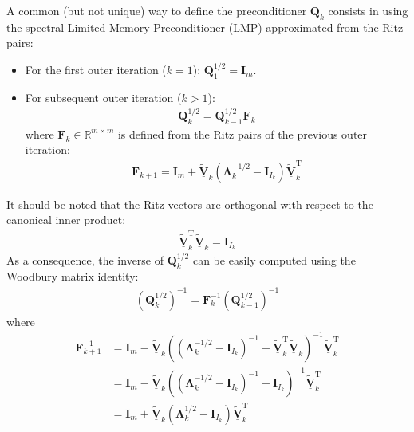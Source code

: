 \documentclass[12pt]{scrartcl}
\begin{document}
A common (but not unique) way to define the preconditioner $\mathbf{Q}_k$ consists in using the spectral Limited Memory Preconditioner (LMP) approximated from the Ritz pairs:
\begin{itemize}
\item For the first outer iteration ($k=1$): $\mathbf{Q}^{1/2}_1 = \mathbf{I}_m$.
\item For subsequent outer iteration ($k>1$):
\begin{align}
\mathbf{Q}^{1/2}_k = \mathbf{Q}^{1/2}_{k-1} \mathbf{F}_k
\end{align}
where $\mathbf{F}_k \in \mathbb{R}^{m \times m}$ is defined from the Ritz pairs of the previous outer iteration:
\begin{align}
\mathbf{F}_{k+1} = \mathbf{I}_m+\underline{\widetilde{\mathbf{V}}}_k \left(\mathbf{\Lambda}_k^{-1/2} - \mathbf{I}_{I_k}\right) \underline{\widetilde{\mathbf{V}}}_k^\mathrm{T}
\end{align}
\end{itemize}
It should be noted that the Ritz vectors are orthogonal with respect to the canonical inner product:
\begin{align}
\underline{\widetilde{\mathbf{V}}}_k^\mathrm{T} \underline{\widetilde{\mathbf{V}}}_k = \mathbf{I}_{I_k}
\end{align}
As a consequence, the inverse of $\mathbf{Q}^{1/2}_k$ can be easily computed using the Woodbury matrix identity:
\begin{align}
\left(\mathbf{Q}^{1/2}_k\right)^{-1} = \mathbf{F}_k^{-1} \left(\mathbf{Q}^{1/2}_{k-1}\right)^{-1}
\end{align}
where
\begin{align}
\mathbf{F}_{k+1}^{-1} & = \mathbf{I}_m-\underline{\widetilde{\mathbf{V}}}_k \left(\left(\mathbf{\Lambda}_k^{-1/2} - \mathbf{I}_{I_k}\right)^{-1}+\underline{\widetilde{\mathbf{V}}}_k^\mathrm{T} \underline{\widetilde{\mathbf{V}}}_k\right)^{-1} \underline{\widetilde{\mathbf{V}}}_k^\mathrm{T} \nonumber \\
& = \mathbf{I}_m-\underline{\widetilde{\mathbf{V}}}_k \left(\left(\mathbf{\Lambda}_k^{-1/2} - \mathbf{I}_{I_k}\right)^{-1}+\mathbf{I}_{I_k}\right)^{-1} \underline{\widetilde{\mathbf{V}}}_k^\mathrm{T} \nonumber \\
& = \mathbf{I}_m+\underline{\widetilde{\mathbf{V}}}_k \left(\mathbf{\Lambda}_k^{1/2}-\mathbf{I}_{I_k}\right) \underline{\widetilde{\mathbf{V}}}_k^\mathrm{T}
\end{align}
\end{document}
